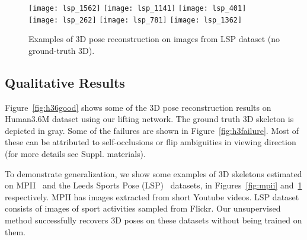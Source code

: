\documentclass[10pt,twocolumn,letterpaper]{article}
\begin{document}
\begin{figure}[htb!]
	\centering
\texttt{[image: lsp\_1562]}
	\texttt{[image: lsp\_1141]}	
	\texttt{[image: lsp\_401]}\\
	\texttt{[image: lsp\_262]}
	\texttt{[image: lsp\_781]}
	\texttt{[image: lsp\_1362]}
	
	\caption{Examples of 3D pose reconstruction on images from LSP dataset (no ground-truth 3D).}
	\label{fig:leeds}
\vspace{-3ex}
\end{figure}


\subsection{Qualitative Results}
Figure~\ref{fig:h36good} shows some of the 3D pose reconstruction results on Human3.6M dataset using our lifting network. The ground truth 3D skeleton is depicted in gray. Some of the failures are shown in Figure~\ref{fig:h3failure}. Most of these can be attributed to self-occlusions or flip ambiguities in viewing direction (for more details see Suppl. materials).

To demonstrate generalization, we show some examples of 3D skeletons estimated on MPII~\cite{andriluka14cvpr} and the Leeds Sports Pose (LSP)~\cite{johnson2010clustered} datasets, in Figures~\ref{fig:mpii} and~\ref{fig:leeds} respectively. MPII has images extracted from short Youtube videos. LSP dataset consists of images of sport activities sampled from Flickr. Our unsupervised method successfully recovers 3D poses on these datasets without being trained on them. 
\end{document}
